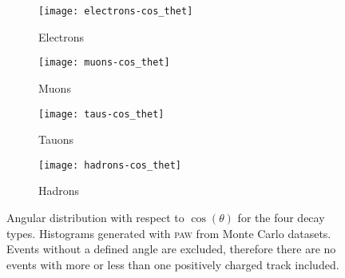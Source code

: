 
\begin{figure}
    \centering
    \begin{subfigure}[c]{0.48\linewidth}
        \centering
        \texttt{[image: electrons-cos\_thet]}
        \caption{%
            Electrons
        }
        \label{fig:paw-angle/electrons}
    \end{subfigure}
    \hfill
    \begin{subfigure}[c]{0.48\linewidth}
        \centering
        \texttt{[image: muons-cos\_thet]}
        \caption{%
            Muons
        }
        \label{fig:paw-angle/muons}
    \end{subfigure}

    \vspace{2ex}

    \begin{subfigure}[c]{0.48\linewidth}
        \centering
        \texttt{[image: taus-cos\_thet]}
        \caption{%
            Tauons
        }
        \label{fig:paw-angle/tauons}
    \end{subfigure}
    \hfill
    \begin{subfigure}[c]{0.48\linewidth}
        \centering
        \texttt{[image: hadrons-cos\_thet]}
        \caption{%
            Hadrons
        }
        \label{fig:paw-angle/hadrons}
    \end{subfigure}

    \caption{%
        Angular distribution with respect to $\cos(\theta)$ for the four decay
        types. Histograms generated with \textsc{paw} from Monte Carlo
        datasets. Events without a defined angle are excluded, therefore there
        are no events with more or less than one positively charged track
        included.
    }
    \label{fig:paw-angle}
\end{figure}
